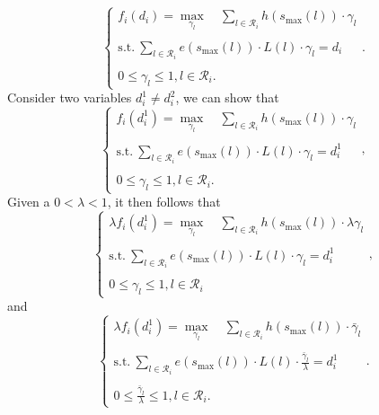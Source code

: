 \documentclass[journal]{IEEEtran}
\begin{document}
\begin{equation}
\left\{\begin{array}{l}
f_i(d_i) = \underset{\gamma_l}{\max} \quad \sum\limits_{l \in \mathcal{R}_i} h\left(s_{\textrm{max}}(l)\right) \cdot \gamma_l\\
\\
{\text{s.t.}} ~
\sum\limits_{l \in \mathcal{R}_i} e(s_{\textrm{max}}(l)) \cdot L(l) \cdot \gamma_l = d_i\\
\\
0 \leq \gamma_l \leq 1, l \in \mathcal{R}_i.\end{array}\right. . 
\end{equation}
Consider two variables $d_i^1 \neq d_i^2$, we can show that 
\begin{equation}
\left\{\begin{array}{l}
f_i(d_i^1) = \underset{\gamma_l}{\max} \quad \sum\limits_{l \in \mathcal{R}_i} h\left(s_{\textrm{max}}(l)\right) \cdot \gamma_l\\
\\
{\text{s.t.}} ~
\sum\limits_{l \in \mathcal{R}_i} e(s_{\textrm{max}}(l)) \cdot L(l) \cdot \gamma_l = d_i^1\\
\\
0 \leq \gamma_l \leq 1, l \in \mathcal{R}_i. \end{array}\right. ,
\end{equation}
Given a $0< \lambda < 1$, it then follows that
\begin{equation}
\left\{\begin{array}{l}
\lambda f_i(d_i^1) = \underset{\gamma_l}{\max} \quad \sum\limits_{l \in \mathcal{R}_i} h\left(s_{\textrm{max}}(l)\right) \cdot \lambda \gamma_l\\
\\
{\text{s.t.}} ~
\sum\limits_{l \in \mathcal{R}_i} e(s_{\textrm{max}}(l)) \cdot L(l) \cdot \gamma_l = d_i^1\\
\\
0 \leq \gamma_l \leq 1, l \in \mathcal{R}_i\end{array}\right. ,
\end{equation}
and 
\begin{equation}
\left\{\begin{array}{l}
\lambda f_i(d_i^1) = \underset{\gamma_l}{\max} \quad \sum\limits_{l \in \mathcal{R}_i} h\left(s_{\textrm{max}}(l)\right) \cdot  \bar{\gamma}_l\\
\\
{\text{s.t.}} ~
\sum\limits_{l \in \mathcal{R}_i} e(s_{\textrm{max}}(l)) \cdot L(l) \cdot \frac{\bar{\gamma}_l}{\lambda} = d_i^1\\
\\
0 \leq \frac{\bar{\gamma}_l}{\lambda} \leq 1, l \in \mathcal{R}_i.\end{array}\right. .
\end{equation}
\end{document}
